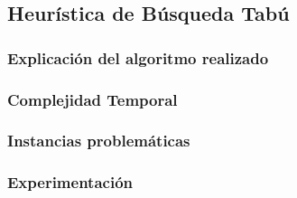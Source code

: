 \subsection{Heurística de Búsqueda Tabú}

\subsubsection{Explicación del algoritmo realizado}
\subsubsection{Complejidad Temporal}
\subsubsection{Instancias problemáticas}
\subsubsection{Experimentación}


